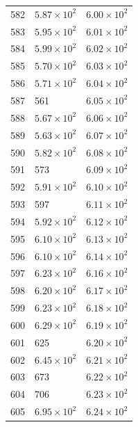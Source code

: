 \begin{table}[H]
\begin{tabular}{lll}
582 & $\displaystyle 5.87 \times 10^{2}$ & $\displaystyle 6.00 \times 10^{2}$ \\
583 & $\displaystyle 5.95 \times 10^{2}$ & $\displaystyle 6.01 \times 10^{2}$ \\
584 & $\displaystyle 5.99 \times 10^{2}$ & $\displaystyle 6.02 \times 10^{2}$ \\
585 & $\displaystyle 5.70 \times 10^{2}$ & $\displaystyle 6.03 \times 10^{2}$ \\
586 & $\displaystyle 5.71 \times 10^{2}$ & $\displaystyle 6.04 \times 10^{2}$ \\
587 & 561 & $\displaystyle 6.05 \times 10^{2}$ \\
588 & $\displaystyle 5.67 \times 10^{2}$ & $\displaystyle 6.06 \times 10^{2}$ \\
589 & $\displaystyle 5.63 \times 10^{2}$ & $\displaystyle 6.07 \times 10^{2}$ \\
590 & $\displaystyle 5.82 \times 10^{2}$ & $\displaystyle 6.08 \times 10^{2}$ \\
591 & 573 & $\displaystyle 6.09 \times 10^{2}$ \\
592 & $\displaystyle 5.91 \times 10^{2}$ & $\displaystyle 6.10 \times 10^{2}$ \\
593 & 597 & $\displaystyle 6.11 \times 10^{2}$ \\
594 & $\displaystyle 5.92 \times 10^{2}$ & $\displaystyle 6.12 \times 10^{2}$ \\
595 & $\displaystyle 6.10 \times 10^{2}$ & $\displaystyle 6.13 \times 10^{2}$ \\
596 & $\displaystyle 6.10 \times 10^{2}$ & $\displaystyle 6.14 \times 10^{2}$ \\
597 & $\displaystyle 6.23 \times 10^{2}$ & $\displaystyle 6.16 \times 10^{2}$ \\
598 & $\displaystyle 6.20 \times 10^{2}$ & $\displaystyle 6.17 \times 10^{2}$ \\
599 & $\displaystyle 6.23 \times 10^{2}$ & $\displaystyle 6.18 \times 10^{2}$ \\
600 & $\displaystyle 6.29 \times 10^{2}$ & $\displaystyle 6.19 \times 10^{2}$ \\
601 & 625 & $\displaystyle 6.20 \times 10^{2}$ \\
602 & $\displaystyle 6.45 \times 10^{2}$ & $\displaystyle 6.21 \times 10^{2}$ \\
603 & 673 & $\displaystyle 6.22 \times 10^{2}$ \\
604 & 706 & $\displaystyle 6.23 \times 10^{2}$ \\
605 & $\displaystyle 6.95 \times 10^{2}$ & $\displaystyle 6.24 \times 10^{2}$ \\

\end{tabular}
\end{table}
